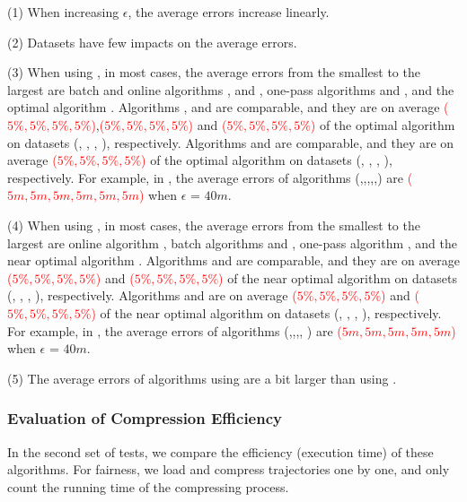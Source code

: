 \sstab (1) When increasing $\epsilon$, the average errors increase linearly. 

\sstab (2) Datasets have few impacts on the average errors.

\sstab (3) When using \ped, in most cases, the average errors from the smallest to the largest are batch and online algorithms \tpa, \dpa and \bqsa, one-pass algorithms \siped and \operb, and the optimal algorithm \optp. Algorithms \tpa, \dpa and \bqsa are comparable, and they are on average \textcolor{red}{($5\%,5\%,5\%,5\%$)},\textcolor{red}{($5\%,5\%,5\%,5\%$)} and \textcolor{red}{($5\%,5\%,5\%,5\%$)} of the optimal algorithm \optp on datasets (\ucar, \geolife, \mopsi, \act), respectively. Algorithms \siped and \operb are comparable, and they are on average \textcolor{red}{($5\%,5\%,5\%,5\%$)} of the optimal algorithm \optp on datasets (\ucar, \geolife, \mopsi, \act), respectively.
For example, in \mopsi, the average errors of algorithms (\optp,\tpa,\dpa,\bqsa,\siped,\operb ) are \textcolor{red}{($5m, 5m,5m,5m,5m,5m$)} when $\epsilon$ = $40m$.

\sstab (4) When using \sed, in most cases, the average errors from the smallest to the largest are online algorithm \squishe, batch algorithms \tpa and \dpa, one-pass algorithm \cised, and the near optimal algorithm \nopts. Algorithms \tpa and \dpa are comparable, and they are on average \textcolor{red}{($5\%,5\%,5\%,5\%$)} and \textcolor{red}{($5\%,5\%,5\%,5\%$)} of the near optimal algorithm \nopts on datasets (\ucar, \geolife, \mopsi, \act), respectively. Algorithms \cised and \squishe are on average \textcolor{red}{($5\%,5\%,5\%,5\%$)} and \textcolor{red}{($5\%,5\%,5\%,5\%$)} of the near optimal algorithm \nopts on datasets (\ucar, \geolife, \mopsi, \act), respectively.
For example, in \mopsi, the average errors of algorithms (\nopts,\tpa,\dpa,\squishe, \cised) are \textcolor{red}{($5m, 5m,5m,5m,5m$)} when $\epsilon$ = $40m$.

\sstab (5) The average errors of algorithms using \sed are a bit larger than using \ped. 



\subsubsection{Evaluation of Compression Efficiency}

In the second set of tests, we compare the efficiency (execution time) of these algorithms.
For fairness, we load and compress trajectories one by one, and only count the running time of the compressing process.



